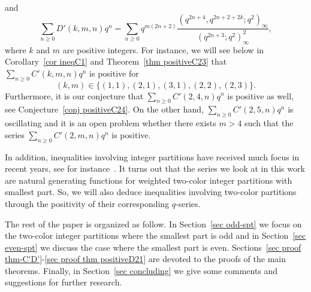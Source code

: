 \documentclass[reqno]{amsart}
\theoremstyle{definition}
\theoremstyle{plain}
\theoremstyle{remark}
\numberwithin{equation}{section}
\newcommand{\fr}{\frac}
\begin{document}
and
\begin{equation}\label{main series2}
\sum_{n\geq 0}  D'(k,m,n) q^n = \sum_{n\geq 0} q^{m(2n+2)} \fr{(q^{2n+4},q^{2n+2+2k};q^2)_\infty}{(q^{2n+3};q^2)_\infty^2},
\end{equation}
where $k$ and $m$ are positive integers.
For instance, we will see below in Corollary~\ref{cor ineqC1} and Theorem~\ref{thm positiveC23} that $\sum_{n\geq 0}C'(k,m,n) q^n$ is positive for
\[
(k,m)\in\{(1,1),(2,1),(3,1),(2,2),(2,3)\}.
\]
Furthermore, it is our conjecture that $\sum_{n\geq 0}C'(2,4,n) q^n$
is positive as well, see Conjecture~\ref{conj positiveC24}. On the other hand, $\sum_{n\geq 0}C'(2,5,n) q^n$
is oscillating and it is an open problem whether there exists $m>4$ such that
the series $\sum_{n\geq 0}C'(2,m,n) q^n$ is positive.

In addition, inequalities involving integer partitions have received much focus in recent years,
see for instance~\cite{Berkovich-Grizzell, Kim-Kim-Lovejoy}.
It turns out that the series we look at in this work are natural generating functions for weighted
two-color integer partitions with smallest part. So, we will also deduce inequalities involving two-color partitions through
the positivity of their corresponding $q$-series.

The rest of the paper is organized as follow. In Section~\ref{sec odd-spt} we focus on the two-color integer partitions where the smallest part is odd
and in Section~\ref{sec even-spt} we discuss the case where the smallest part is even. Sections~\ref{sec proof thm-C'D'}-\ref{sec proof thm positiveD21}
are devoted to the proofs of the main theorems. Finally, in Section~\ref{sec concluding} we give some comments and suggestions for further research.
%
\end{document}
